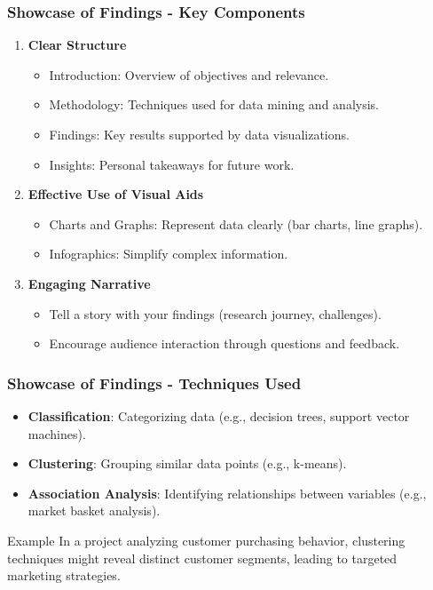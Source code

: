 \documentclass[aspectratio=169]{beamer}
\begin{document}
\begin{frame}[fragile]
    \frametitle{Showcase of Findings - Key Components}
    \begin{enumerate}
        \item \textbf{Clear Structure}
            \begin{itemize}
                \item Introduction: Overview of objectives and relevance.
                \item Methodology: Techniques used for data mining and analysis.
                \item Findings: Key results supported by data visualizations.
                \item Insights: Personal takeaways for future work.
            \end{itemize}
        \item \textbf{Effective Use of Visual Aids}
            \begin{itemize}
                \item Charts and Graphs: Represent data clearly (bar charts, line graphs).
                \item Infographics: Simplify complex information.
            \end{itemize}
        \item \textbf{Engaging Narrative}
            \begin{itemize}
                \item Tell a story with your findings (research journey, challenges).
                \item Encourage audience interaction through questions and feedback.
            \end{itemize}
    \end{enumerate}
\end{frame}

\begin{frame}[fragile]
    \frametitle{Showcase of Findings - Techniques Used}
    \begin{itemize}
        \item \textbf{Classification}: Categorizing data (e.g., decision trees, support vector machines).
        \item \textbf{Clustering}: Grouping similar data points (e.g., k-means).
        \item \textbf{Association Analysis}: Identifying relationships between variables (e.g., market basket analysis).
    \end{itemize}
    \begin{block}{Example}
        In a project analyzing customer purchasing behavior, clustering techniques might reveal distinct customer segments, leading to targeted marketing strategies.
    \end{block}
\end{frame}
\end{document}
